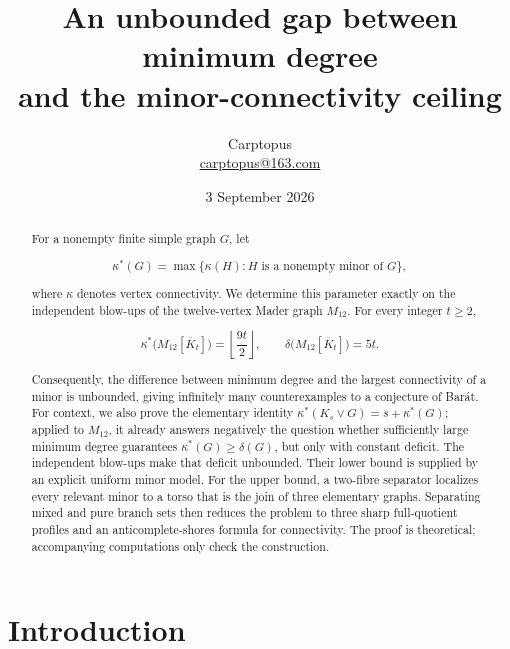 \documentclass[11pt]{article}
\title{An unbounded gap between minimum degree\\
and the minor-connectivity ceiling}
\author{Carptopus\\\href{mailto:carptopus@163.com}{carptopus@163.com}}
\date{3 September 2026}
\begin{document}
\maketitle

\begin{center}
\end{center}

\begin{abstract}


For a nonempty finite simple graph $G$, let

\nopagebreak[4]
\[
\kappa^*(G)=\max\{\kappa(H):H\text{ is a nonempty minor of }G\},
\]

where $\kappa$ denotes vertex connectivity. We determine this parameter exactly
on the independent blow-ups of the twelve-vertex Mader graph $M_{12}$. For every
integer $t\geq2$,

\nopagebreak[4]
\[
\kappa^*\bigl(M_{12}[\overline K_t]\bigr)
=\left\lfloor\frac{9t}{2}\right\rfloor,
\qquad
\delta\bigl(M_{12}[\overline K_t]\bigr)=5t.
\]

Consequently, the difference between minimum degree and the largest
connectivity of a minor is unbounded, giving infinitely many counterexamples
to a conjecture of Barát. For context, we also prove the elementary identity
$\kappa^*(K_s\vee G)=s+\kappa^*(G)$; applied to $M_{12}$, it already answers
negatively the question whether sufficiently large minimum degree guarantees
$\kappa^*(G)\geq\delta(G)$, but only with constant deficit. The independent
blow-ups make that deficit unbounded. Their lower bound is supplied by an
explicit uniform minor model. For the upper bound, a two-fibre separator
localizes every relevant minor to a torso that is the join of three elementary
graphs. Separating mixed and pure branch sets then reduces the problem to three
sharp full-quotient profiles and an anticomplete-shores formula for
connectivity. The proof is theoretical; accompanying computations only check
the construction.

\end{abstract}

\section{Introduction}
\end{document}

